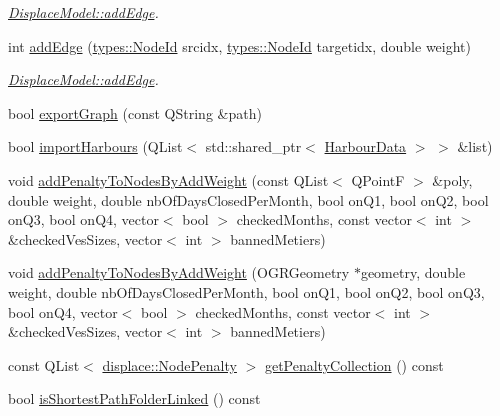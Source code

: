 \begin{DoxyCompactItemize}
\begin{DoxyCompactList}\small\item\em \mbox{\hyperlink{class_displace_model_a6afb3dffa06c671b14e46f59666abded}{Displace\+Model\+::add\+Edge}}. \end{DoxyCompactList}\item 
int \mbox{\hyperlink{class_displace_model_a34f88d3f49199bde7af89fd5854a778b}{add\+Edge}} (\mbox{\hyperlink{classtypes_1_1_node_id}{types\+::\+Node\+Id}} srcidx, \mbox{\hyperlink{classtypes_1_1_node_id}{types\+::\+Node\+Id}} targetidx, double weight)
\begin{DoxyCompactList}\small\item\em \mbox{\hyperlink{class_displace_model_a6afb3dffa06c671b14e46f59666abded}{Displace\+Model\+::add\+Edge}}. \end{DoxyCompactList}\item 
bool \mbox{\hyperlink{class_displace_model_ab855bb4cd38f92dcd1a89a42c2c7c1af}{export\+Graph}} (const Q\+String \&path)
\item 
bool \mbox{\hyperlink{class_displace_model_a0b5af1c3b6db271becbf4bd9de91d87b}{import\+Harbours}} (Q\+List$<$ std\+::shared\+\_\+ptr$<$ \mbox{\hyperlink{class_harbour_data}{Harbour\+Data}} $>$ $>$ \&list)
\item 
void \mbox{\hyperlink{class_displace_model_aba15f27df50726960cf667f99daae0e7}{add\+Penalty\+To\+Nodes\+By\+Add\+Weight}} (const Q\+List$<$ Q\+PointF $>$ \&poly, double weight, double nb\+Of\+Days\+Closed\+Per\+Month, bool on\+Q1, bool on\+Q2, bool on\+Q3, bool on\+Q4, vector$<$ bool $>$ checked\+Months, const vector$<$ int $>$ \&checked\+Ves\+Sizes, vector$<$ int $>$ banned\+Metiers)
\item 
void \mbox{\hyperlink{class_displace_model_ae7d7e49c4a36522007010a2a55d61a82}{add\+Penalty\+To\+Nodes\+By\+Add\+Weight}} (O\+G\+R\+Geometry $\ast$geometry, double weight, double nb\+Of\+Days\+Closed\+Per\+Month, bool on\+Q1, bool on\+Q2, bool on\+Q3, bool on\+Q4, vector$<$ bool $>$ checked\+Months, const vector$<$ int $>$ \&checked\+Ves\+Sizes, vector$<$ int $>$ banned\+Metiers)
\item 
const Q\+List$<$ \mbox{\hyperlink{classdisplace_1_1_node_penalty}{displace\+::\+Node\+Penalty}} $>$ \mbox{\hyperlink{class_displace_model_ae69e43d4acbea20edec16e0786fd00a8}{get\+Penalty\+Collection}} () const
\item 
bool \mbox{\hyperlink{class_displace_model_ab362a6cf416aafece4049701682e0af0}{is\+Shortest\+Path\+Folder\+Linked}} () const
\item 

\end{DoxyCompactItemize}
